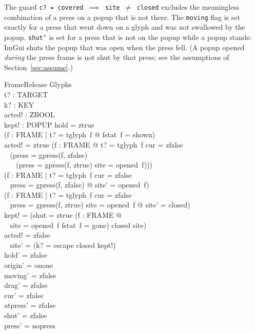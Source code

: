 \documentclass[a4paper,10pt,fleqn]{article}
\begin{document}
The guard \texttt{c?~=~covered~$\implies$~site~$\neq$~closed} excludes the
meaningless combination of a press on a popup that is not there.  The
\texttt{moving} flag is set exactly for a press that went down on a glyph and
was not swallowed by the popup.  \texttt{shut'} is set for a press that is not
on the popup while a popup stands: ImGui shuts the popup that was open when the
press fell.  (A popup opened \emph{during} the press frame is not shut by that
press; see the assumptions of Section~\ref{sec:assume}.)

\begin{schema}{FrameRelease}
  \Delta Glyphs \\
  t? : TARGET \\
  k? : KEY \\
  acted! : ZBOOL \\
  kept! : POPUP
\where
  hold = ztrue \\
  (\forall f : FRAME | t? = tglyph~f @ fstat~f = shown) \\
  acted! = ztrue \iff (\exists f : FRAME @ t? = tglyph~f \land cur = zfalse \\
  \quad~ \land (press = gpress(f, zfalse) \\
  \quad~ \quad~ \lor (press = gpress(f, ztrue) \land site = opened~f))) \\
  (\forall f : FRAME | t? = tglyph~f \land cur = zfalse \\
  \quad~ \land press = gpress(f, zfalse) @ site' = opened~f) \\
  (\forall f : FRAME | t? = tglyph~f \land cur = zfalse \\
  \quad~ \land press = gpress(f, ztrue) \land site = opened~f @ site' = closed) \\
  kept! = (\IF shut = ztrue \lor (\exists f : FRAME @ \\
  \quad~ site = opened~f \land fstat~f = gone) \THEN closed \ELSE site) \\
  acted! = zfalse \implies \\
  \quad~ site' = (\IF k? = escape \THEN closed \ELSE kept!) \\
  hold' = zfalse \\
  origin' = onone \\
  moving' = zfalse \\
  drag' = zfalse \\
  cur' = zfalse \\
  atpress' = zfalse \\
  shut' = zfalse \\
  press' = nopress \\

\end{schema}
\end{document}

